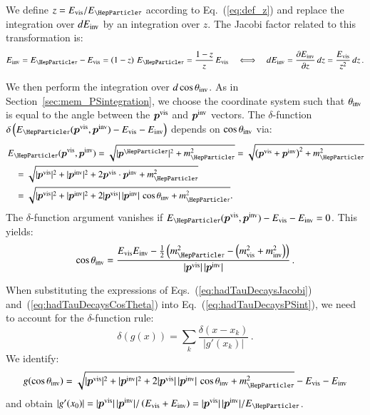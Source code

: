 We define $z = E_{\vis}/E_{\Pgt}$ according to Eq.~(\ref{eq:def_z}) and replace the integration over $dE_{\textrm{inv}}$ by an integration over $z$.
The Jacobi factor related to this transformation is:
\begin{equation}
E_{\inv} = E_{\Pgt} - E_{\vis} = \left( 1 - z \right)
\, E_{\Pgt} = \frac{1 - z}{z} \, E_{\vis}
  \quad \Longleftrightarrow \quad dE_{\inv} = \frac{\partial E_{\inv}}{\partial z} \, dz = \frac{E_{\vis}}{z^{2}} \, dz \, .
\label{eq:hadTauDecaysJacobi}
\end{equation}

We then perform the integration over $d\cos\theta_{\textrm{inv}}$.
As in Section~\ref{sec:mem_PSintegration}, we choose the coordinate system such that
$\theta_{\textrm{inv}}$ is equal to the angle between the $\bm{p}^{\textrm{vis}}$ and $\bm{p}^{\textrm{inv}}$ vectors.
The $\delta$-function $\delta \left( E_{\Pgt}(\bm{p}^{\vis}, \bm{p}^{\inv}) - E_{\vis} - E_{\inv} \right)$ depends on $\cos\theta_{\textrm{inv}}$ via:
\begin{align}
& \, E_{\Pgt}(\bm{p}^{\vis}, \bm{p}^{\inv}) 
= \sqrt{\vert\bm{p}^{\Pgt}\vert^{2} + m^{2}_{\Pgt}} = \sqrt{\left( \bm{p}^{\vis} + \bm{p}^{\inv} \right)^2 + m^{2}_{\Pgt}} \nonumber \\
& \quad = \sqrt{\vert\bm{p}^{\vis}\vert^{2} + \vert\bm{p}^{\inv}\vert^{2} + 2 \bm{p}^{\vis}
  \cdot \bm{p}^{\inv} + m^{2}_{\Pgt}} \nonumber \\
& \quad = \sqrt{\vert\bm{p}^{\vis}\vert^{2} + \vert\bm{p}^{\inv}\vert^{2} + 2 \vert\bm{p}^{\vis}\vert \, \vert\bm{p}^{\inv}\vert \, \cos\theta_{\inv} + m^{2}_{\Pgt}}.
\end{align}
The $\delta$-function argument vanishes if $E_{\Pgt}(\bm{p}^{\vis}, \bm{p}^{\inv}) - E_{\vis} - E_{\inv} = 0$. 
This yields:
\begin{equation}
\cos\theta_{\inv} 
  = \frac{E_{\vis} E_{\inv} - \frac{1}{2} \left(m^{2}_{\Pgt} - \left(
        m^{2}_{\vis} + m^{2}_{\inv} \right)
    \right)}{\vert\bm{p}^{\vis}\vert \, \vert\bm{p}^{\inv}\vert} \, .
\label{eq:hadTauDecaysCosTheta}
\end{equation}

When substituting the expressions of Eqs.~(\ref{eq:hadTauDecaysJacobi}) and~(\ref{eq:hadTauDecaysCosTheta}) into Eq.~(\ref{eq:hadTauDecaysPSint}),
we need to account for the $\delta$-function rule:
\begin{equation} 
\delta \left( g(x) \right) = \sum_{k} \frac{\delta \left( x - x_{k}
  \right)}{\vert g'(x_{k}) \vert} \, .
\label{eq:deltaFuncRule}
\end{equation}
We identify:
\begin{equation} 
g(\cos\theta_{\inv}) = \sqrt{\vert\bm{p}^{\vis}\vert^{2} + \vert\bm{p}^{\inv}\vert^{2}
  + 2 \vert\bm{p}^{\vis}\vert \, \vert\bm{p}^{\inv}\vert \,
  \cos\theta_{\inv} + m^{2}_{\Pgt}} - E_{\vis} - E_{\inv}
\end{equation}
and obtain $\vert g'(x_{0}) \vert = \vert\bm{p}^{\vis}\vert \,
\vert\bm{p}^{\inv}\vert / \left( E_{\vis} + E_{\inv} \right) = \vert\bm{p}^{\vis}\vert \,
\vert\bm{p}^{\inv}\vert / E_{\Pgt}$.

